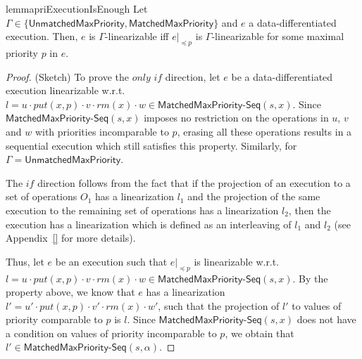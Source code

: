 \begin{restatable}{lemma}{priExecutionIsEnough}
\label{lemma:pri execution is enough}
Let $\Gamma\in \{\mathsf{UnmatchedMaxPriority}, \mathsf{MatchedMaxPriority}\}$ and $e$ a data-differentiated execution. Then, $e$ is $\Gamma$-linearizable iff $e\vert_{\preceq p}$ is $\Gamma$-linearizable for some maximal priority $p$ in $e$.
\end{restatable}
\begin {proof} (Sketch)
To prove the $\textit{only if}$ direction, let $e$ be a data-differentiated execution linearizable w.r.t. $l = u \cdot \textit{put}(x,p) \cdot v \cdot \textit{rm}(x) \cdot w \in \mathsf{MatchedMaxPriority}\mathsf{\text{-}Seq}(s,x)$. Since $\mathsf{MatchedMaxPriority}\mathsf{\text{-}Seq}(s,x)$ imposes no restriction on the operations in $u$, $v$ and $w$ with priorities incomparable to $p$, erasing all these operations results in a sequential execution which still satisfies this property. Similarly, for $\Gamma=\mathsf{UnmatchedMaxPriority}$.

The $\textit{if}$ direction follows from the fact that if the projection of an execution to a set of operations $O_1$ has a linearization $l_1$ and the projection of the same execution to the remaining set of operations has a linearization $l_2$, then the execution has a linearization which is defined as an interleaving of $l_1$ and $l_2$ (see Appendix~\ref{} for more details).

Thus, let $e$ be an execution such that $e\vert_{\preceq p}$ is linearizable w.r.t. $l = u \cdot \textit{put}(x,p) \cdot v \cdot \textit{rm}(x) \cdot w \in \mathsf{MatchedMaxPriority}\mathsf{\text{-}Seq}(s,x)$. By the property above, we know that $e$ has a linearization $l' = u' \cdot \textit{put}(x,p) \cdot v' \cdot \textit{rm}(x) \cdot w'$, such that the projection of $l'$ to values of priority comparable to $p$ is $l$.
Since $\mathsf{MatchedMaxPriority}\mathsf{\text{-}Seq}(s,x)$ does not have a condition on values of priority incomparable to $p$, we obtain that $l' \in \mathsf{MatchedMaxPriority}\mathsf{\text{-}Seq}(s,\alpha)$.
\end {proof}

